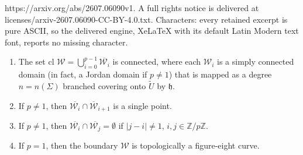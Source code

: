 \documentclass[10pt,a4paper]{amsart}
\def\Z{{\mathbb{Z}}}
\def\cW{\mathcal {W}}
\newcommand{\clo}{{\text{cl}}\,\,}
\renewcommand{\tilde}{\widetilde}
\begin{document}
https://arxiv.org/abs/2607.06090v1. A full rights notice is delivered at licenses/arxiv-2607.06090-CC-BY-4.0.txt. Characters: every retained excerpt is pure ASCII, so the delivered engine, XeLaTeX with its default Latin Modern text font, reports no missing character.
\begin{lemma}\label{lifted_tiling_top_lem}
\noindent\begin{enumerate}[leftmargin=8mm]
\item The set $\displaystyle\clo{\pmb{\cW}}=\bigcup_{i=0}^{p-1} \overline{\pmb{\cW}_i}$ is connected, where each $\pmb{\cW}_i$ is a simply connected domain (in fact, a Jordan domain if $p\neq 1$) that is mapped as a degree $n=n(\Sigma)$ branched covering onto $\tilde U$ by $\mathfrak{h}$.
\item  If $p\neq 1$, then $\overline{\pmb{\cW}_i}\cap \overline{\pmb{\cW}}_{i+1}$ is a single point.
\item If $p\neq 1$, then $\overline{\pmb{\cW}_i}\cap \overline{\pmb{\cW}_j}=\emptyset$ if $\vert j-i\vert\neq1$, $i,j\in\Z/p\Z$.
\item If $p=1$, then the boundary $\pmb{\cW}$ is topologically a figure-eight curve.
\end{enumerate}
\end{lemma}
\end{document}
